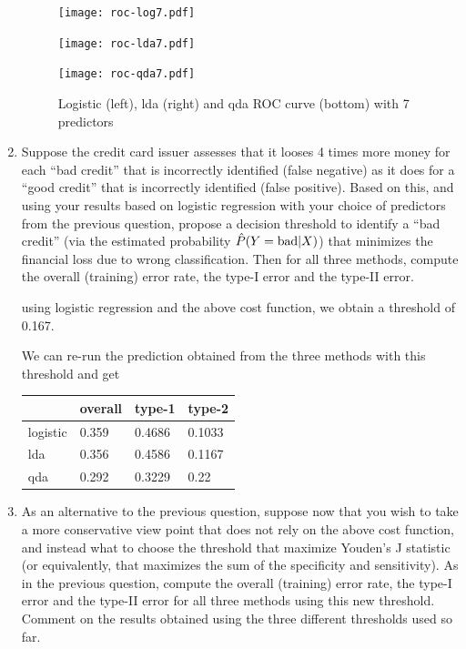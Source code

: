 \documentclass[11pt]{article}
\begin{document}
\begin{enumerate}
  \begin{figure}[htb]
  \caption{Logistic (left), lda  (right) and qda ROC curve (bottom) with 7 predictors}
  \label{fig:roc7}
  \label{roc5pred}
  \begin{minipage}{0.48\linewidth}
  \texttt{[image: roc-log7.pdf]}
\end{minipage}
\begin{minipage}{0.48\linewidth}
  \texttt{[image: roc-lda7.pdf]}
  \end{minipage}
  \centering
    \texttt{[image: roc-qda7.pdf]}
  \end{figure}
 
  
\item Suppose the credit card issuer assesses that it looses 4 times more money for each ``bad credit'' that is incorrectly identified (false negative)  as it does for a ``good credit'' that is incorrectly identified (false positive). Based on this, and using your results based on logistic regression with your choice of predictors from the previous question, propose a decision threshold  to identify a ``bad credit'' (via the estimated probability $\hat{P}(Y={\rm bad}|X)$) that minimizes the financial loss due to wrong classification. Then for all three methods, compute the overall (training) error rate, the type-I error and the type-II error. %

   using logistic regression and the above cost function, we obtain a threshold of 0.167.

  We can re-run the prediction obtained from the three methods with this threshold and get

  \begin{tabular}{| l | lll |}
  \hline
   & overall & type-1 & type-2 \\
   \hline
    logistic &   0.359 & 0.4686 &0.1033\\
    lda&   0.356 &  0.4586 & 0.1167\\
    qda & 0.292 &0.3229 & 0.22\\
    \hline
  \end{tabular}
  
\item As an alternative to the previous question, suppose now that you wish to take a more conservative view point that does not rely on the above cost function, and instead what to choose the threshold that maximize Youden's J statistic (or equivalently, that maximizes the sum of the specificity and sensitivity). As in the previous question, compute the overall (training) error rate, the type-I error and the type-II error for all three methods using this new threshold. Comment on the results obtained using the three different thresholds used so far.


\end{enumerate}
\end{document}
